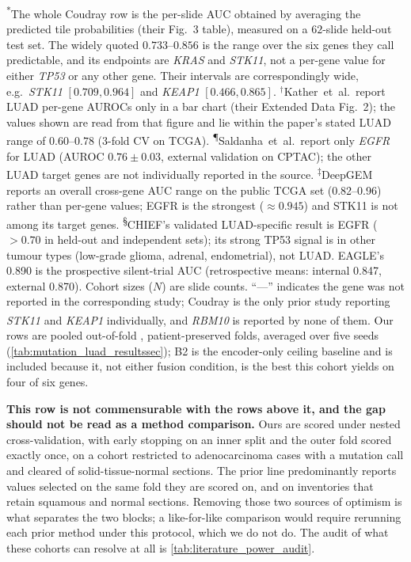 \begin{flushleft}\footnotesize
\textsuperscript{*}The whole Coudray row is the per-slide AUC obtained by
averaging the predicted tile probabilities (their Fig.~3 table), measured on a
$62$-slide held-out test set. The widely quoted $0.733$--$0.856$ is the range
over the six genes they call predictable, and its endpoints are \textit{KRAS}
and \textit{STK11}, not a per-gene value for either \textit{TP53} or any other
gene. Their intervals are correspondingly wide, e.g.\ \textit{STK11}
$[0.709,0.964]$ and \textit{KEAP1} $[0.466,0.865]$.
$^{\dagger}$Kather~et~al.\ report LUAD per-gene AUROCs only in a bar chart
(their Extended Data Fig.~2); the values shown are read from that figure and lie
within the paper's stated LUAD range of $0.60$--$0.78$ (3-fold CV on TCGA).
\textsuperscript{\P}Saldanha~et~al.\ report only \textit{EGFR} for LUAD
(AUROC $0.76\!\pm\!0.03$, external validation on CPTAC); the other LUAD
target genes are not individually reported in the source.
\textsuperscript{$\ddagger$}DeepGEM reports an overall cross-gene AUC range
on the public TCGA set (0.82--0.96) rather than per-gene values; EGFR is
the strongest (${\approx}0.945$) and STK11 is not among its target genes.
\textsuperscript{\S}CHIEF's validated LUAD-specific result is EGFR
($>0.70$ in held-out and independent sets); its strong TP53 signal is in
other tumour types (low-grade glioma, adrenal, endometrial), not LUAD.
EAGLE's 0.890 is the prospective silent-trial AUC (retrospective means:
internal 0.847, external 0.870).
Cohort sizes ($N$) are slide counts.
``---'' indicates the gene was not reported in the corresponding study;
Coudray is the only prior study reporting \textit{STK11} and \textit{KEAP1}
individually, and \textit{RBM10} is reported by none of them.
\textsuperscript{\textbardbl}Our rows are pooled out-of-fold \auroc{},
patient-preserved folds, averaged over five seeds
(\cref{tab:mutation_luad_resultssec}); B2 is the encoder-only ceiling
baseline and is included because it, not either fusion condition, is the
best this cohort yields on four of six genes.
\par\smallskip
\textbf{This row is not commensurable with the rows above it, and the gap
should not be read as a method comparison.} Ours are scored under nested
cross-validation, with early stopping on an inner split and the outer fold
scored exactly once, on a cohort restricted to adenocarcinoma cases with a
mutation call and cleared of solid-tissue-normal sections. The prior line
predominantly reports values selected on the same fold they are scored on,
and on inventories that retain squamous and normal sections. Removing those
two sources of optimism is what separates the two blocks; a like-for-like
comparison would require rerunning each prior method under this protocol,
which we do not do. The audit of what these cohorts can resolve at all is
\cref{tab:literature_power_audit}.
\end{flushleft}
